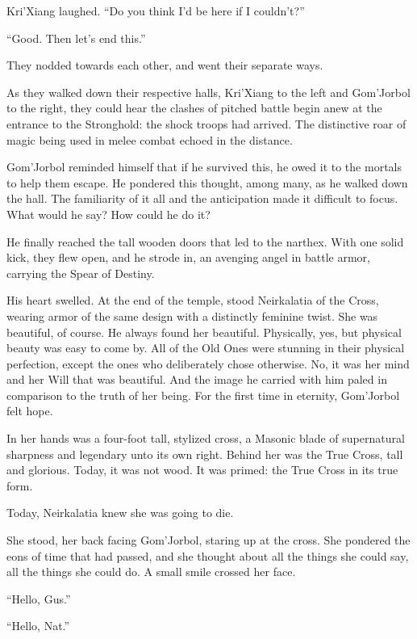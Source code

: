 Kri’Xiang laughed. “Do you think I’d be here if I couldn’t?”

“Good. Then let’s end this.”

They nodded towards each other, and went their separate ways.

As they walked down their respective halls, Kri’Xiang to the left and Gom’Jorbol to the right, they could hear the clashes of pitched battle begin anew at the entrance to the Stronghold: the shock troops had arrived. The distinctive roar of magic being used in melee combat echoed in the distance.

Gom’Jorbol reminded himself that if he survived this, he owed it to the mortals to help them escape. He pondered this thought, among many, as he walked down the hall. The familiarity of it all and the anticipation made it difficult to focus. What would he say? How could he do it?

He finally reached the tall wooden doors that led to the narthex. With one solid kick, they flew open, and he strode in, an avenging angel in battle armor, carrying the Spear of Destiny.

His heart swelled. At the end of the temple, stood Neirkalatia of the Cross, wearing armor of the same design with a distinctly feminine twist. She was beautiful, of course. He always found her beautiful. Physically, yes, but physical beauty was easy to come by. All of the Old Ones were stunning in their physical perfection, except the ones who deliberately chose otherwise. No, it was her mind and her Will that was beautiful. And the image he carried with him paled in comparison to the truth of her being. For the first time in eternity, Gom’Jorbol felt hope.

In her hands was a four-foot tall, stylized cross, a Masonic blade of supernatural sharpness and legendary unto its own right. Behind her was the True Cross, tall and glorious. Today, it was not wood. It was primed: the True Cross in its true form.

Today, Neirkalatia knew she was going to die.

She stood, her back facing Gom’Jorbol, staring up at the cross. She pondered the eons of time that had passed, and she thought about all the things she could say, all the things she could do. A small smile crossed her face.

“Hello, Gus.”

“Hello, Nat.”
